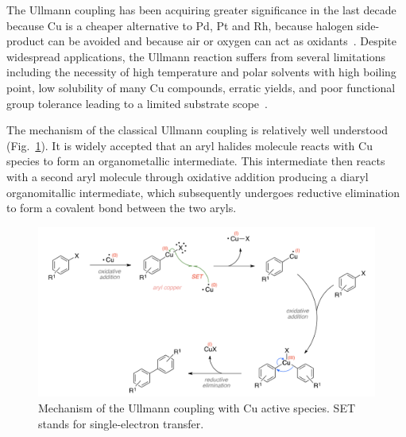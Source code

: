 \documentclass[%
 reprint,
 amsmath,amssymb,
 aps,
prb,
]{revtex4-2}
\begin{document}
The Ullmann coupling has been acquiring greater significance in the last decade because Cu is a cheaper alternative to Pd, Pt and Rh, because halogen side-product can be avoided and because air or oxygen can act as oxidants~\cite{ullmann_38,ullmann_39,ullmann_40,ullmann_41}. Despite widespread applications, the Ullmann reaction suffers from several limitations including the necessity of high temperature and polar solvents with high boiling point, low solubility of many Cu compounds, erratic yields, and poor functional group tolerance leading to a limited substrate scope~\cite{ullmann_31}. %

The mechanism of the classical Ullmann coupling is relatively well understood (Fig.~\ref{fig:classical}).
It is widely accepted that an aryl halides molecule reacts with Cu species to form an organometallic intermediate. This intermediate then reacts with a second aryl molecule through oxidative addition producing a diaryl organomitallic intermediate, which subsequently undergoes reductive elimination to form a covalent bond between the two aryls. 

\begin{figure}[htb]
\centering
\includegraphics[width=1.0\columnwidth]{Fig/classical-mechanism.png}
\caption{Mechanism of the Ullmann coupling with Cu active species. SET stands for single-electron transfer. %
}
\label{fig:classical}
\end{figure}
\end{document}

